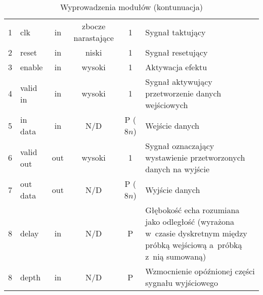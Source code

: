 \begin{table}[t]
\begin{tabular}{|c|l|c|c|c|m{4.5cm}|}
\rowcolor[HTML]{34CDF9}\multicolumn{6}{|l|}{Efekt \textit{delay}} \\ \hline
1            & clk       & in           & zbocze narastające    & 1                 & Sygnał taktujący                                                                                                           \\ \hline
2            & reset     & in           & niski                 & 1                 & Sygnał resetujący                                                                                                          \\ \hline
3            & enable    & in           & wysoki                & 1                 & Aktywacja efektu                                                                                                           \\ \hline
4            & valid in  & in           & wysoki                & 1                 & Sygnał aktywujący przetworzenie danych wejściowych                                                                         \\ \hline
5            & in data   & in           & N/D                   & P ($8n$)          & Wejście danych                                                                                                             \\ \hline
6            & valid out & out          & wysoki                & 1                 & Sygnał oznaczający wystawienie przetworzonych danych na wyjście                                                            \\ \hline
7            & out data  & out          & N/D                   & P ($8n$)          & Wyjście danych                                                                                                             \\ \hline
8            & delay     & in           & N/D                   & P                 & Głębokość echa rozumiana jako odległość (wyrażona w~czasie dyskretnym między próbką wejściową a~próbką z~nią sumowaną)     \\ \hline
8            & depth     & in           & N/D                   & P                 & Wzmocnienie opóźnionej części sygnału wyjściowego                                                                          \\ \hline
\end{tabular}
\caption{Wyprowadzenia modułów (kontunuacja)}
\end{table}


